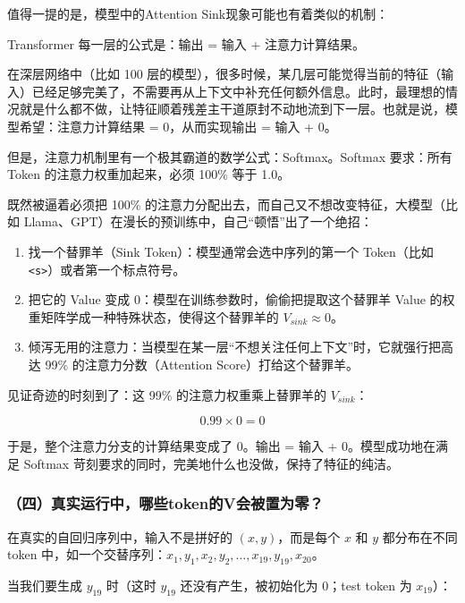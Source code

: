 值得一提的是，模型中的Attention Sink现象可能也有着类似的机制：

Transformer 每一层的公式是：输出 = 输入 + 注意力计算结果。

在深层网络中（比如 100 层的模型），很多时候，某几层可能觉得当前的特征（输入）已经足够完美了，不需要再从上下文中补充任何额外信息。此时，最理想的情况就是什么都不做，让特征顺着残差主干道原封不动地流到下一层。也就是说，模型希望：注意力计算结果 = 0，从而实现输出 = 输入 + 0。

但是，注意力机制里有一个极其霸道的数学公式：Softmax。Softmax 要求：所有 Token 的注意力权重加起来，必须 100\% 等于 1.0。

既然被逼着必须把 100\% 的注意力分配出去，而自己又不想改变特征，大模型（比如 Llama、GPT）在漫长的预训练中，自己``顿悟''出了一个绝招：

\begin{enumerate}
\def\labelenumi{\arabic{enumi}.}
\tightlist
\item
  找一个替罪羊（Sink Token）：模型通常会选中序列的第一个 Token（比如 \texttt{\textless{}s\textgreater{}}）或者第一个标点符号。
\item
  把它的 Value 变成 0：模型在训练参数时，偷偷把提取这个替罪羊 Value 的权重矩阵学成一种特殊状态，使得这个替罪羊的 \(V_{sink} \approx 0\)。
\item
  倾泻无用的注意力：当模型在某一层``不想关注任何上下文''时，它就强行把高达 99\% 的注意力分数（Attention Score）打给这个替罪羊。
\end{enumerate}

见证奇迹的时刻到了：这 99\% 的注意力权重乘上替罪羊的 \(V_{sink}\)：

\[
0.99 \times 0 = 0
\]

于是，整个注意力分支的计算结果变成了 0。输出 = 输入 + 0。模型成功地在满足 Softmax 苛刻要求的同时，完美地什么也没做，保持了特征的纯洁。

\hypertarget{ux56dbux771fux5b9eux8fd0ux884cux4e2dux54eaux4e9btokenux7684vux4f1aux88abux7f6eux4e3aux96f6}{%
\subsubsection{（四）真实运行中，哪些token的V会被置为零？}\label{ux56dbux771fux5b9eux8fd0ux884cux4e2dux54eaux4e9btokenux7684vux4f1aux88abux7f6eux4e3aux96f6}}

在真实的自回归序列中，输入不是拼好的 \((x,y)\)，而是每个 \(x\) 和 \(y\) 都分布在不同 token 中，如一个交替序列：\(x_1,y_1,x_2,y_2,\ldots,x_{19},y_{19},x_{20}\)。

当我们要生成 \(y_{19}\) 时（这时 \(y_{19}\) 还没有产生，被初始化为 \(0\)；test token 为 \(x_{19}\)）：

